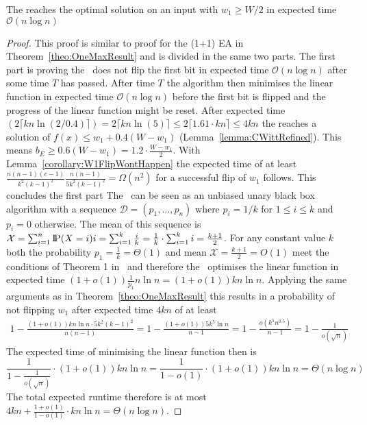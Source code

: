 \begin{lemma}\label{lemma:RLSRoneMaxInput}
    The \RLSR[k] reaches the optimal solution on an input with $w_1\ge W/2$ in expected time $\mathcal{O}(n\log{}n)$
\end{lemma}
\begin{proof}
    This proof is similar to proof for the (1+1) EA in Theorem~\ref{theo:OneMaxResult} and is divided in the same two parts.
    The first part is proving the \RLSR~does not flip the first bit in expected time $\mathcal{O}(n\log{}n)$ after some time $T$ has passed.
    After time $T$ the algorithm then minimises the linear function in expected time $\mathcal{O}(n\log{}n)$ before the first bit is flipped and the progress of the linear function might be reset.
    After expected time $(2\lceil kn\ln(2/0.4)\rceil)=2\lceil kn\ln(5)\rceil\le2\lceil 1.61\cdot kn\rceil\le4kn$ the \RLSR[k] reaches a solution of \(f(x)\le w_1+0.4(W-w_1)\) (Lemma~\ref{lemma:CWittRefined}).
    This means \(b_E \ge 0.6(W-w_1) = 1.2\cdot\frac{W-w_1}{2}\).
    With Lemma~\ref{corollary:W1FlipWontHappen} the expected time of at least \(\frac{n(n-1)(c-1)}{k^2{(k-1)}^2}\frac{n(n-1)}{5k^2{(k-1)}^2}=\Omega(n^2)\) for a successful flip of $w_1$ follows. This concludes the first part\newline
    The \RLSR~can be seen as an unbiased unary black box algorithm with a sequence $\mathcal{D}=(p_1,\dots,p_n)$ where $p_i=1/k$ for $1\le i\le k$ and $p_i=0$ otherwise.
    The mean of this sequence is \(\mathcal{X}=\sum_{i=1}^{n}{\text{I\kern-0.15em P}(X=i)i}=\sum_{i=1}^{k}{\frac{i}{k}}=\frac{1}{k}\cdot\sum_{i=1}^{k}{i}=\frac{k+1}{2}\).
    For any constant value $k$ both the probability $p_1=\frac{1}{k}=\Theta(1)$ and mean $\mathcal{X}=\frac{k+1}{2}=O(1)$ meet the conditions of Theorem 1 in~\cite{doerr2023tight} and therefore the \RLSR~optimises the linear function in expected time \((1+o(1))\frac{1}{p_1}n\ln n=(1+o(1))kn\ln n\).
    Applying the same arguments as in Theorem~\ref{theo:OneMaxResult} this results in a probability of not flipping $w_1$ after expected time $4kn$ of at least
    \begin{gather}\nonumber
        1-\frac{(1+o(1))kn\ln n\cdot5k^2{(k-1)}^2}{n(n-1)}
        =1-\frac{(1+o(1))5k^5\ln n}{n-1}
        =1-\frac{o(k^5n^{0.5})}{n-1}
        =1-\frac{1}{o(\sqrt{n})}
    \end{gather}
    The expected time of minimising the linear function then is
    \[\frac{1}{1-\frac{1}{o(\sqrt{n})}}\cdot(1+o(1))kn\ln n=\frac{1}{1-o(1)}\cdot(1+o(1))kn\ln n=\Theta(n\log{}n)\]
    The total expected runtime therefore is at most $4kn+\frac{1+o(1)}{1-o(1)}\cdot kn\ln n=\Theta(n\log{}n)$.


\end{proof}

